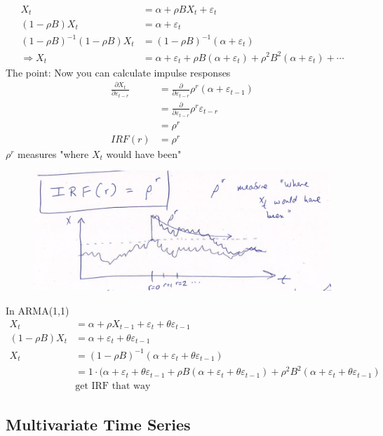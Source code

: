 \begin{align*}
    X_t &= \alpha+ \rho B X_t + \varepsilon_t\\
    (1-\rho B) X_t &= \alpha + \varepsilon_t \\
    (1-\rho B)^{-1}(1-\rho B) X_t &= (1-\rho B)^{-1} (\alpha + \varepsilon_t)\\
    \Rightarrow X_t &= \alpha + \varepsilon_t + \rho B(\alpha + \varepsilon_t)+ \rho^2 B^2(\alpha+\varepsilon_t) + \cdots
\end{align*}
The point: Now you can calculate impulse responses
\begin{align*}
    \frac{\partial X_t}{\partial \varepsilon_{t-r}} &= \frac{\partial}{\partial\varepsilon_{t-r}} \rho^r (\alpha+\varepsilon_{t-1}) \\
    &= \frac{\partial}{\partial \varepsilon_{t-r}} \rho^r \varepsilon_{t-r} \\
    &= \rho^r\\
    IRF(r) &= \rho^r
\end{align*}
$\rho^r$ measures "where $X_t$ would have been"
\begin{figure}[H]
    \centering
    \includegraphics[width=0.75\linewidth]{images/Screenshot 2024-05-21 at 18.16.58.jpg}
\end{figure}

In ARMA(1,1)
\begin{align*}
    X_t &= \alpha + \rho X_{t-1} + \varepsilon_t + \theta \varepsilon_{t-1} \\
    (1-\rho B)X_t &= \alpha + \varepsilon_t + \theta \varepsilon_{t-1} \\
    X_t &= (1-\rho B)^{-1} (\alpha + \varepsilon_t + \theta \varepsilon_{t-1}) \\
&= 1\cdot (\alpha + \varepsilon_t + \theta \varepsilon_{t-1} + \rho B (\alpha + \varepsilon_t + \theta \varepsilon_{t-1}) + \rho^2 B^2(\alpha + \varepsilon_t + \theta\varepsilon_{t-1})\\
&\text{get IRF that way}
\end{align*}

\subsection{Multivariate Time Series}


